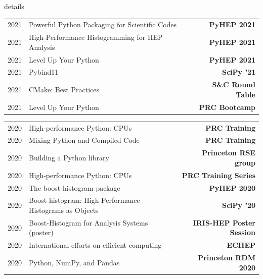 \documentclass[10pt,letterpaper]{moderncv}
\begin{document}
\begin{taggedblock}{details}
\begin{tabularx}{\textwidth}{p{.33in}>{\raggedright\arraybackslash}X>{\bfseries}r}
    2021 & Powerful Python Packaging for Scientific Codes & PyHEP 2021 \\
    2021 & High-Performance Histogramming for HEP Analysis & PyHEP 2021 \\
    2021 & Level Up Your Python & PyHEP 2021 \\
    2021 & Pybind11 & SciPy '21 \\
    2021 & CMake: Best Practices & S\&C Round Table \\
    2021 & Level Up Your Python & PRC Bootcamp \\
\end{tabularx}

\begin{tabularx}{\textwidth}{p{.33in}>{\raggedright\arraybackslash}X>{\bfseries}r}
    2020 & High-performance Python: CPUs & PRC Training \\
    2020 & Mixing Python and Compiled Code & PRC Training \\
    2020 & Building a Python library & Princeton RSE group \\
    2020 & High-performance Python: CPUs & PRC Training Series \\
    2020 & The boost-histogram package & PyHEP 2020 \\
    2020 & Boost-histogram: High-Performance Histograms as Objects & SciPy '20 \\
    2020 & Boost-Histogram for Analysis Systems (poster) & IRIS-HEP Poster Session \\
    2020 & International efforts on efficient computing & ECHEP \\
    2020 & Python, NumPy, and Pandas & Princeton RDM 2020 \\
\end{tabularx}


\end{taggedblock}
\end{document}
